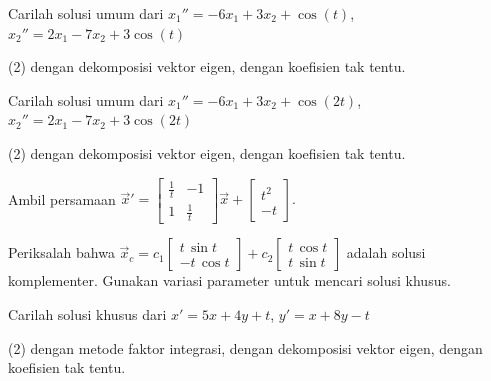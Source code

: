 \begin{exercise}
Carilah solusi umum dari
$x_1'' = -6x_1+ 3x_2 + \cos (t)$, 
$x_2'' = 2x_1 -7x_2 + 3\cos (t)$
\begin{tasks}(2)
\task dengan dekomposisi vektor eigen,
\task dengan koefisien tak tentu.
\end{tasks}
\end{exercise}

\begin{exercise}
Carilah solusi umum dari
$x_1'' = -6x_1+ 3x_2 + \cos (2t)$, 
$x_2'' = 2x_1 -7x_2 + 3\cos (2t)$
\begin{tasks}(2)
\task dengan dekomposisi vektor eigen,
\task dengan koefisien tak tentu.
\end{tasks}
\end{exercise}

\begin{exercise}
Ambil persamaan
$\displaystyle
{\vec{x}}'
=
\begin{bmatrix}
\frac{1}{t} & -1 \\
1 & \frac{1}{t}
\end{bmatrix}
\vec{x}
+ \begin{bmatrix} t^2 \\ -t \end{bmatrix} .
$
\begin{tasks}
\task
Periksalah bahwa
$\displaystyle
\vec{x}_c =
c_1
\begin{bmatrix}
t\, \sin t \\
- t \, \cos t
\end{bmatrix}
+
c_2
\begin{bmatrix}
t\, \cos t \\
t \, \sin t
\end{bmatrix}
$
adalah solusi komplementer.
\task
Gunakan variasi parameter untuk
mencari solusi khusus.
\end{tasks}
\end{exercise}

\setcounter{exercise}{100}

\begin{exercise}
Carilah solusi khusus dari $x' = 5x + 4y + t$, $y' = x + 8y - t$
\begin{tasks}(2)
\task dengan metode faktor integrasi,
\task dengan dekomposisi vektor eigen,
\task dengan koefisien tak tentu.
\end{tasks}
\end{exercise}

